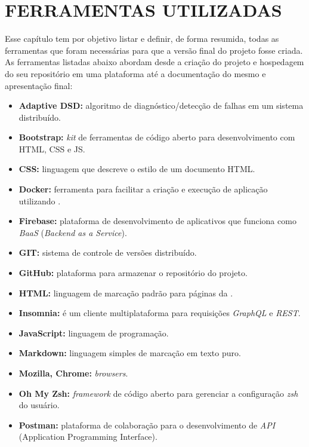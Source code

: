 
\chapter{FERRAMENTAS UTILIZADAS}
\label{chap:ferramentas_utilizadas}

Esse capítulo tem por objetivo listar e definir, de forma resumida, todas as ferramentas que foram necessárias para que a versão final do projeto fosse criada. As ferramentas listadas abaixo abordam desde a criação do projeto e hospedagem do seu repositório em uma plataforma \online{} até a documentação do mesmo e apresentação final:

\begin{itemize}
    \item \textbf{Adaptive DSD:} algoritmo de diagnóstico/detecção de falhas em um sistema distribuído. 
    \item \textbf{Bootstrap:} \textit{kit} de ferramentas de código aberto para desenvolvimento com HTML, CSS e JS.
    \item \textbf{CSS:} linguagem que descreve o estilo de um documento HTML.
    \item \textbf{Docker:} ferramenta para facilitar a criação e execução de aplicação utilizando \containers{}.
    \item \textbf{Firebase:} plataforma de desenvolvimento de aplicativos que funciona como \textit{BaaS} (\textit{Backend as a Service}).
    \item \textbf{GIT:} sistema de controle de versões distribuído.
    \item \textbf{GitHub:} plataforma \online{} para armazenar o repositório do projeto.
    \item \textbf{HTML:} linguagem de marcação padrão para páginas da \web{}.
    \item \textbf{Insomnia:} é um cliente multiplataforma para requisições \textit{GraphQL} e \textit{REST}. 
    \item \textbf{JavaScript:} linguagem de programação.
    \item \textbf{Markdown:} linguagem simples de marcação em texto puro.
    \item \textbf{Mozilla, Chrome:} \textit{browsers}.
    \item \textbf{Oh My Zsh:} \textit{framework} de código aberto para gerenciar a configuração \textit{zsh} do usuário.
    \item \textbf{Postman:} plataforma de colaboração para o desenvolvimento de \textit{API} (Application Programming Interface).

\end{itemize}
